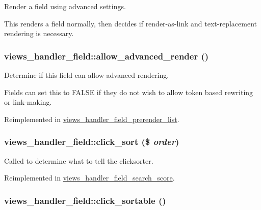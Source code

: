 Render a field using advanced settings.

This renders a field normally, then decides if render-as-link and text-replacement rendering is necessary. \hypertarget{classviews__handler__field_cdeb45612be43c2d58814726b35e55aa}{
\subsubsection[{allow\_\-advanced\_\-render}]{\setlength{\rightskip}{0pt plus 5cm}views\_\-handler\_\-field::allow\_\-advanced\_\-render ()}}
\label{classviews__handler__field_cdeb45612be43c2d58814726b35e55aa}


Determine if this field can allow advanced rendering.

Fields can set this to FALSE if they do not wish to allow token based rewriting or link-making. 

Reimplemented in \hyperlink{classviews__handler__field__prerender__list_341b000d2b0e13c3819e47165ca33ec9}{views\_\-handler\_\-field\_\-prerender\_\-list}.\hypertarget{classviews__handler__field_1c8cabe835ba05ed045c8f6eec6a36b8}{
\subsubsection[{click\_\-sort}]{\setlength{\rightskip}{0pt plus 5cm}views\_\-handler\_\-field::click\_\-sort (\$ {\em order})}}
\label{classviews__handler__field_1c8cabe835ba05ed045c8f6eec6a36b8}


Called to determine what to tell the clicksorter. 

Reimplemented in \hyperlink{classviews__handler__field__search__score_b3ddf2a010848822c751a774f5bf9a67}{views\_\-handler\_\-field\_\-search\_\-score}.\hypertarget{classviews__handler__field_22ef16d2b34823a3d12f273d34278b00}{
\subsubsection[{click\_\-sortable}]{\setlength{\rightskip}{0pt plus 5cm}views\_\-handler\_\-field::click\_\-sortable ()}}
\label{classviews__handler__field_22ef16d2b34823a3d12f273d34278b00}


